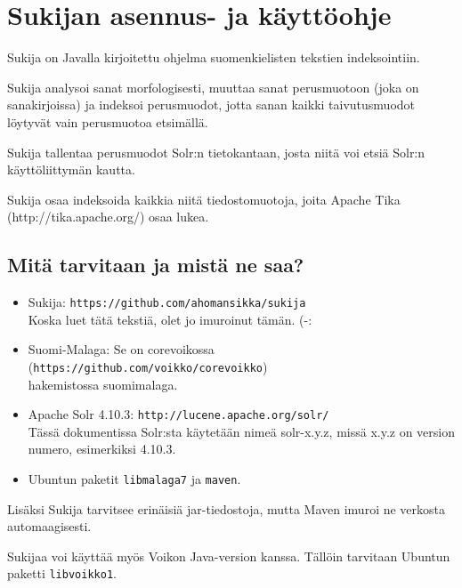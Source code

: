 \documentclass[12pt,a4paper]{scrartcl}
\begin{document}
\pagestyle{fancy}
\setlength{\parindent}{0pt}
\setlength{\parskip}{1ex plus 0.5ex minus 0.2ex}
\section*{Sukijan asennus- ja käyttöohje}

Sukija on Javalla kirjoitettu ohjelma suomenkielisten tekstien
indeksointiin.

Sukija analysoi sanat morfologisesti, muuttaa sanat perusmuotoon (joka
on sanakirjoissa) ja indeksoi perusmuodot, jotta sanan kaikki
taivutusmuodot löytyvät vain perusmuotoa etsimällä.

Sukija tallentaa perusmuodot Solr:n tietokantaan, josta niitä voi
etsiä Solr:n käyttöliittymän kautta.

Sukija osaa indeksoida kaikkia niitä tiedostomuotoja, joita Apache
Tika \\(http://tika.apache.org/) osaa lukea.

\subsection*{Mitä tarvitaan ja mistä ne saa?}

\begin{itemize}

\item Sukija:
      \verb=https://github.com/ahomansikka/sukija= \\
      Koska luet tätä tekstiä, olet jo imuroinut tämän. (-:

\item Suomi-Malaga: Se on corevoikossa
      (\verb=https://github.com/voikko/corevoikko=) \\
      hakemistossa suomimalaga.

\item Apache Solr 4.10.3:
      \verb=http://lucene.apache.org/solr/= \\
      Tässä dokumentissa Solr:sta käytetään nimeä solr-x.y.z,
      missä x.y.z on version numero, esimerkiksi 4.10.3.

\item Ubuntun paketit \verb=libmalaga7= ja \verb=maven=.
\end{itemize}

Lisäksi Sukija tarvitsee erinäisiä jar-tiedostoja, mutta Maven imuroi
ne verkosta automaagisesti.

Sukijaa voi käyttää myös Voikon Java-version kanssa. Tällöin tarvitaan
Ubuntun paketti \verb=libvoikko1=.
\end{document}
